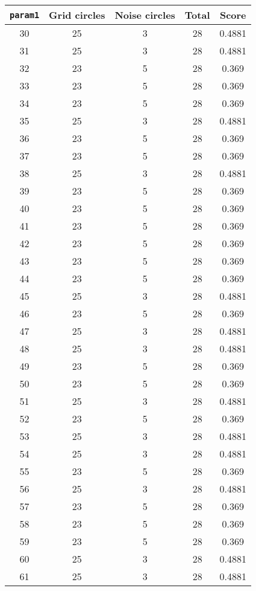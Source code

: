\documentclass[letterpaper, 12pt]{article}
\begin{document}
\begin{longtable}{|c|c|c|c|c|}
\hline
\textbf{\texttt{param1}} & \textbf{Grid circles} & \textbf{Noise circles} & \textbf{Total} & \textbf{Score} \\
\hline
30 & 25 & 3 & 28 & 0.4881 \\
\hline
31 & 25 & 3 & 28 & 0.4881 \\
\hline
32 & 23 & 5 & 28 & 0.369 \\
\hline
33 & 23 & 5 & 28 & 0.369 \\
\hline
34 & 23 & 5 & 28 & 0.369 \\
\hline
35 & 25 & 3 & 28 & 0.4881 \\
\hline
36 & 23 & 5 & 28 & 0.369 \\
\hline
37 & 23 & 5 & 28 & 0.369 \\
\hline
38 & 25 & 3 & 28 & 0.4881 \\
\hline
39 & 23 & 5 & 28 & 0.369 \\
\hline
40 & 23 & 5 & 28 & 0.369 \\
\hline
41 & 23 & 5 & 28 & 0.369 \\
\hline
42 & 23 & 5 & 28 & 0.369 \\
\hline
43 & 23 & 5 & 28 & 0.369 \\
\hline
44 & 23 & 5 & 28 & 0.369 \\
\hline
45 & 25 & 3 & 28 & 0.4881 \\
\hline
46 & 23 & 5 & 28 & 0.369 \\
\hline
47 & 25 & 3 & 28 & 0.4881 \\
\hline
48 & 25 & 3 & 28 & 0.4881 \\
\hline
49 & 23 & 5 & 28 & 0.369 \\
\hline
50 & 23 & 5 & 28 & 0.369 \\
\hline
51 & 25 & 3 & 28 & 0.4881 \\
\hline
52 & 23 & 5 & 28 & 0.369 \\
\hline
53 & 25 & 3 & 28 & 0.4881 \\
\hline
54 & 25 & 3 & 28 & 0.4881 \\
\hline
55 & 23 & 5 & 28 & 0.369 \\
\hline
56 & 25 & 3 & 28 & 0.4881 \\
\hline
57 & 23 & 5 & 28 & 0.369 \\
\hline
58 & 23 & 5 & 28 & 0.369 \\
\hline
59 & 23 & 5 & 28 & 0.369 \\
\hline
60 & 25 & 3 & 28 & 0.4881 \\
\hline
61 & 25 & 3 & 28 & 0.4881 \\

\end{longtable}
\end{document}
